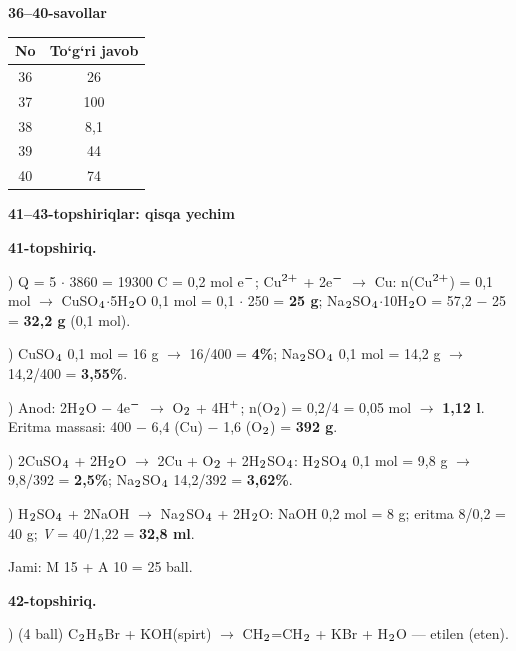 \documentclass[11pt,a4paper]{article}
\renewcommand{\textsubscript}[1]{\ensuremath{_{\text{\fontsize{8}{8}\selectfont #1}}}}
\renewcommand{\textsuperscript}[1]{\ensuremath{^{\text{\fontsize{8}{8}\selectfont #1}}}}
\begin{document}
\noindent\textbf{36--40-savollar}\par\smallskip
\noindent\begin{tabular}{|c|c|}\hline \textbf{No} & \textbf{To`g`ri javob}\\\hline
36 & 26\\\hline
37 & 100\\\hline
38 & 8,1\\\hline
39 & 44\\\hline
40 & 74\\\hline
\end{tabular}\par\medskip
\noindent\textbf{41--43-topshiriqlar: qisqa yechim}\par\smallskip
\noindent\textbf{41-topshiriq.}\par
{}) Q = 5 $\cdot$ 3860 = 19300 C = 0,2 mol e\textsuperscript{$-$}; Cu\textsuperscript{2+} + 2e\textsuperscript{$-$} $\to$ Cu: n(Cu\textsuperscript{2+}) = 0,1 mol $\to$ CuSO\textsubscript{4}$\cdot$5H\textsubscript{2}O 0,1 mol = 0,1 $\cdot$ 250 = \textbf{25 g}; Na\textsubscript{2}SO\textsubscript{4}$\cdot$10H\textsubscript{2}O = 57,2 $-$ 25 = \textbf{32,2 g} (0,1 mol).\par
{}) CuSO\textsubscript{4} 0,1 mol = 16 g $\to$ 16/400 = \textbf{4\%}; Na\textsubscript{2}SO\textsubscript{4} 0,1 mol = 14,2 g $\to$ 14,2/400 = \textbf{3,55\%}.\par
{}) Anod: 2H\textsubscript{2}O $-$ 4e\textsuperscript{$-$} $\to$ O\textsubscript{2} + 4H\textsuperscript{+}; n(O\textsubscript{2}) = 0,2/4 = 0,05 mol $\to$ \textbf{1,12 l}. Eritma massasi: 400 $-$ 6,4 (Cu) $-$ 1,6 (O\textsubscript{2}) = \textbf{392 g}.\par
{}) 2CuSO\textsubscript{4} + 2H\textsubscript{2}O $\to$ 2Cu + O\textsubscript{2} + 2H\textsubscript{2}SO\textsubscript{4}: H\textsubscript{2}SO\textsubscript{4} 0,1 mol = 9,8 g $\to$ 9,8/392 = \textbf{2,5\%}; Na\textsubscript{2}SO\textsubscript{4} 14,2/392 = \textbf{3,62\%}.\par
{}) H\textsubscript{2}SO\textsubscript{4} + 2NaOH $\to$ Na\textsubscript{2}SO\textsubscript{4} + 2H\textsubscript{2}O: NaOH 0,2 mol = 8 g; eritma 8/0,2 = 40 g; \textit{V} = 40/1,22 = \textbf{32,8 ml}.\par
\noindent Jami: M 15 + A 10 = 25 ball.\par
\noindent\textbf{42-topshiriq.}\par
{}) (4 ball) C\textsubscript{2}H\textsubscript{5}Br + KOH(spirt) $\to$ CH\textsubscript{2}=CH\textsubscript{2} + KBr + H\textsubscript{2}O --- etilen (eten).\par
\end{document}
